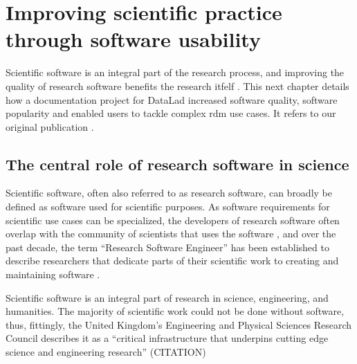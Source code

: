 

\chapter{Improving scientific practice through software usability}
\label{chap:k2}



Scientific software is an integral part of the research process, and improving the quality of research software benefits the research itfelf \citep{goble2014better}.
This next chapter details how a documentation project for DataLad increased software quality, software popularity and enabled users to tackle complex \gls{rdm} use cases.
It refers to our original publication \citep{wagner2020datalad}.


\section{The central role of research software in science}


Scientific software, often also referred to as research software, can broadly be defined as software used for scientific purposes.
As software requirements for scientific use cases can be specialized, the developers of research software often overlap with the community of scientists that uses the software \citep{hannay2009scientists}, and over the past decade, the term ``Research Software Engineer'' has been established to describe researchers that dedicate parts of their scientific work to creating and maintaining software \citep{hettrickRSE}.

Scientific software is an integral part of research in science, engineering, and humanities.
The majority of scientific work could not be done without software, thus, fittingly, the United Kingdom's Engineering and Physical Sciences Research Council describes it as a ``critical infrastructure that underpins cutting edge science and engineering research'' (CITATION) %

